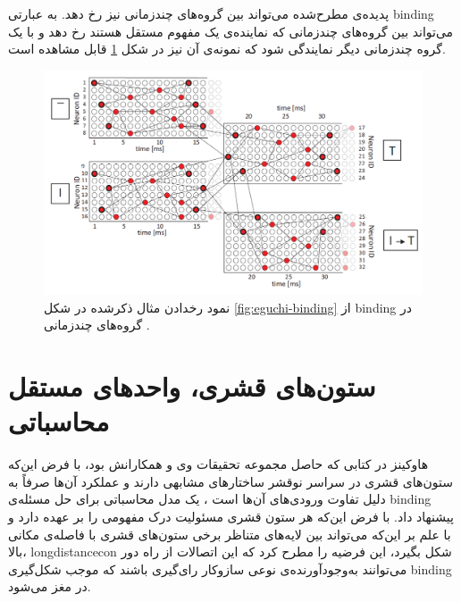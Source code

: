 \documentclass[12pt]{report}
\begin{document}
	پدیده‌ی مطرح‌شده می‌تواند بین گروه‌های چندزمانی نیز رخ دهد. به عبارتی \gls{binding} می‌تواند بین گروه‌های چندزمانی که نماینده‌ی یک مفهوم مستقل هستند رخ دهد و با یک گروه چندزمانی دیگر نمایندگی شود که نمونه‌ی آن نیز در شکل \ref{fig:eguchi-binding-group} قابل مشاهده است.
	
	\begin{figure}[H]
		\centering
		\includegraphics[width=1.0\linewidth]{poly-group-bind.png}
		\caption[NS]{
			نمود رخدادن مثال ذکر‌شده در شکل \ref{fig:eguchi-binding}  از \gls{binding} در گروه‌های چند‌زمانی \cite{EGUCHI2018a}.
		}
		\label{fig:eguchi-binding-group}
	\end{figure}
	
	\section{ستون‌های قشری، واحد‌های مستقل محاسباتی}
	هاوکینز در کتابی \cite{Hawkins2021-rq} که حاصل مجموعه تحقیقات‌ وی و همکارانش
	\cite{Hawkins2016, Hawkins2017, Lewis2019}
	بود، با فرض این‌که ستون‌های قشری در سراسر نوقشر ساختار‌های مشابهی دارند و عملکرد آن‌ها صرفاً به دلیل تفاوت ورودی‌های آن‌ها است \cite{Mountcastle1978}، یک مدل محاسباتی برای حل مسئله‌ی \gls{binding} پیشنهاد داد. با فرض این‌که هر ستون قشری مسئولیت درک مفهومی را بر عهده دارد و با علم بر این‌که می‌تواند بین لایه‌های متناظر برخی ستون‌های قشری با فاصله‌ی مکانی بالا، \gls{longdistancecon} شکل بگیرد، این فرضیه را مطرح کرد که این اتصالات از راه دور می‌توانند به‌وجود‌آورنده‌ی نوعی سازوکار رای‌گیری باشند که  موجب شکل‌گیری \gls{binding} در مغز می‌شود.
	
\end{document}
